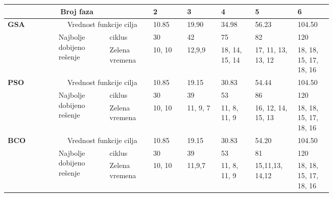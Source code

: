 \begin{table*}
    \begin{center}
      \begin{tabular}{p{0.12\linewidth}p{0.12\linewidth}p{0.1\linewidth}p{0.08\linewidth}p{0.08\linewidth}p{0.08\linewidth}p{0.08\linewidth}p{0.08\linewidth}}
        \hline 
        \multicolumn{3}{c}{Broj faza} & 2 & 3 & 4 & 5 & 6 \\ 
        \hline 
        \multirow{3}{4em}{\textbf{GSA}} & \multicolumn{2}{c}{Vrednost funkcije cilja}                    
        & 10.85 & 19.90 & 34.98 & 56.23 & 104.50 \\ 
        \cmidrule{2-8}
        & \multirow{2}{0.9\linewidth}{Najbolje dobijeno rešenje} & ciklus 
        & 30 & 42 & 75 & 82 & 120 \\ 
                               \cmidrule{3-8}
                               &  & Zelena vremena   
        & 10, 10 & 12,9,9 & 18, 14, 15, 14 & 17, 11, 13, 13, 12 & 18, 18, 15, 17, 18, 16 \\ 
  
  
        \hline
        \multirow{3}{4em}{\textbf{PSO}} & \multicolumn{2}{c}{Vrednost funkcije cilja}                    
        & 10.85 & 19.15 & 30.83 & 54.44 & 104.50 \\ 
        \cmidrule{2-8}
        & \multirow{2}{0.9\linewidth}{Najbolje dobijeno rešenje} & ciklus 
        & 30 & 39 & 53 & 86 & 120 \\ 
                               \cmidrule{3-8}
                               &  & Zelena vremena   
        & 10, 10 & 11, 9, 7 & 11, 8, 11, 9 & 16, 12, 14, 15, 13 & 18, 18, 15, 17, 18, 16 \\ 
  
  
        \hline
        \multirow{3}{4em}{\textbf{BCO}} & \multicolumn{2}{c}{Vrednost funkcije cilja}                    
        & 
        10.85  & 19.15  & 30.83  & 54.20  & 104.50 \\ 
        \cmidrule{2-8}
        & \multirow{2}{0.9\linewidth}{Najbolje dobijeno rešenje} & ciklus 
        & 30 & 39 & 53 & 81 & 120 \\ 
                               \cmidrule{3-8}
                               &  & Zelena vremena   
        & 10, 10 & 11,9,7 &11, 8, 11, 9 & 15,11,13, 14,12 & 18, 18, 15, 17, 18, 16 \\ 
  
  
        \hline
      \end{tabular}
    \end{center}
  \end{table*}
  
